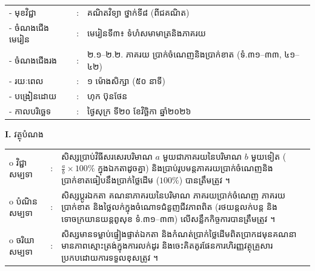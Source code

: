 \documentclass[a4paper,10pt]{article}
\newcommand{\wcirc}{{\CourierBullet\fontsize{9.5pt}{11pt}\selectfont o}}
\begin{document}
{\renewcommand{\arraystretch}{0.98}
\hspace*{3.1cm}%
\begin{tabular}{@{}l l L{11.0cm}@{}}
  - \hspace{0.35cm} មុខវិជ្ជា & : & គណិតវិទ្យា ថ្នាក់ទី៨ (ពីជគណិត) \\
  - \hspace{0.35cm} ចំណងជើងមេរៀន & : & មេរៀនទី៣៖ ទំហំសមាមាត្រនិងភាគរយ \\
  - \hspace{0.35cm} ចំណងជើងរង & : & ២.១–២.២. ភាគរយ ប្រាក់ចំណេញនិងប្រាក់ខាត (ទំ.៣១–៣៣, ៤១–៤២) \\
  - \hspace{0.35cm} រយៈពេល & : & ១ ម៉ោងសិក្សា (៥០ នាទី) \\
  - \hspace{0.35cm} បង្រៀនដោយ & : & ហុក ប៊ុនថែន \\
  - \hspace{0.35cm} កាលបរិច្ឆេទ & : & ថ្ងៃសុក្រ ទី២០ ខែវិច្ឆិកា ឆ្នាំ២០២៦ \\
\end{tabular}

\vspace{2pt}

\textbf{I.} {\muol វត្ថុបំណង}\\[1pt]
\hspace*{0.55cm}%
\begin{tabular}{@{}l l L{14.2cm}@{}}
  \wcirc \hspace{0.25cm} វិជ្ជាសម្បទា & : & សិស្សប្រាប់វិធីសរសេរបរិមាណ $a$ មួយជាភាគរយនៃបរិមាណ $b$ មួយទៀត ($\frac{a}{b}\times 100\%$ ក្នុងឯកតាដូចគ្នា) និងប្រាប់រូបមន្តភាគរយប្រាក់ចំណេញនិងប្រាក់ខាតធៀបនឹងប្រាក់ថ្លៃដើម ($100\%$) បានត្រឹមត្រូវ ។ \\
  \wcirc \hspace{0.25cm} បំណិនសម្បទា & : & សិស្សប្ដូរឯកតា គណនាភាគរយនៃបរិមាណ ភាគរយប្រាក់ចំណេញ ភាគរយប្រាក់ខាត និងថ្លៃលក់ក្នុងចំណោទជំនួញជីវភាពពិត (រថយន្តលក់បន្ត និងទោចក្រយានយន្តពូសុខ ទំ.៣១–៣៣) លើសន្លឹកកិច្ចការបានត្រឹមត្រូវ ។ \\
  \wcirc \hspace{0.25cm} ចរិយាសម្បទា & : & សិស្សមានទម្លាប់ផ្ទៀងផ្ទាត់ឯកតា និងកំណត់ប្រាក់ថ្លៃដើមពិតប្រាកដមុនគណនា មានភាពស្មោះត្រង់ក្នុងការលក់ដូរ និងចេះគិតគូរផែនការហិរញ្ញវត្ថុគ្រួសារប្រកបដោយការទទួលខុសត្រូវ ។ \\
\end{tabular}

}
\end{document}
